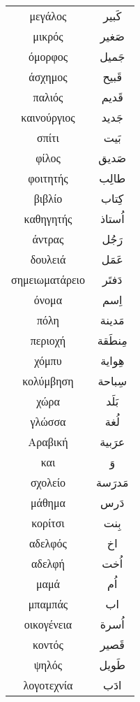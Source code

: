 \documentclass[twocolumn,a4paper]{article}
\newcommand{\ar}[1]{\textarabic{#1}}
\begin{document}
\renewcommand*{\arraystretch}{3}
\begin{supertabular}{ c c }

μεγάλος     & \ar{ كَبير } \\
μικρός      & \ar{ صَغير } \\
όμορφος     & \ar{ جَميل } \\
άσχημος     & \ar{ قَبيح } \\
παλιός      & \ar{ قَديم } \\
καινούργιος & \ar{ جَديد } \\
σπίτι       & \ar{ بَيت } \\
φίλος       & \ar{ صَديق } \\
φοιτητής    & \ar{ طالِب } \\
βιβλίο      & \ar{ كِتاب } \\
καθηγητής   & \ar{ اُستاذ} \\
άντρας      & \ar{ رَجُل } \\
δουλειά     & \ar{ عَمَل } \\
σημειωματάρειο & \ar{ دَفتَر } \\
όνομα       & \ar{اِسم } \\
πόλη        & \ar{ مَدينة } \\
περιοχή     & \ar{ مِنطَقة } \\
χόμπυ       & \ar{ هِواية } \\
κολύμβηση   & \ar{ سِباحة } \\
χώρα        & \ar{ بَلَد } \\
γλώσσα      & \ar{ لُغة } \\
Αραβική     & \ar{ عرَبية } \\
και         & \ar{ وَ } \\
σχολείο     & \ar{ مَدرَسة } \\
μάθημα      & \ar{ دَرس } \\
κορίτσι     & \ar{ بِنت } \\
αδελφός     & \ar{ اخ } \\
αδελφή      & \ar{ اُخت } \\
μαμά        & \ar{ اُم} \\
μπαμπάς     & \ar{ اب } \\
οικογένεια  & \ar{ اُسرة } \\
κοντός      & \ar{ قَصير } \\
ψηλός       & \ar{ طَويل } \\
λογοτεχνία  & \ar{ ادَب } \\

\end{supertabular}
\end{document}
